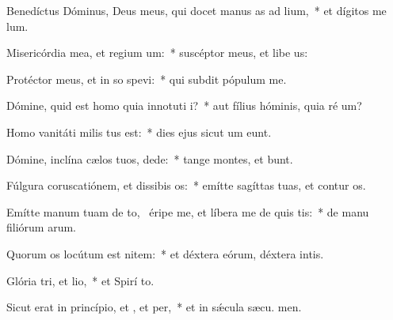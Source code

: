 \item Benedíctus Dóminus, Deus meus, qui docet manus as ad lium,~* et dígitos me  lum.
\item Misericórdia mea, et regium um:~* suscéptor meus, et libe us:
\item Protéctor meus, et in so spevi:~* qui subdit pópulum   me.
\item Dómine, quid est homo quia innotuti i?~* aut fílius hóminis, quia ré um?
\item Homo vanitáti milis tus est:~* dies ejus sicut um eunt.
\item Dómine, inclína cælos tuos,  dede:~* tange montes, et bunt.
\item Fúlgura coruscatiónem, et dissibis os:~* emítte sagíttas tuas, et contur os.
\item Emítte manum tuam de to,~\pscross{} éripe me, et líbera me de quis tis:~* de manu filiórum arum.
\item Quorum os locútum est nitem:~* et déxtera eórum, déxtera intis.
\item Glória tri, et lio,~* et Spirí to.
\item Sicut erat in princípio, et , et per,~* et in sǽcula sæcu. men.
